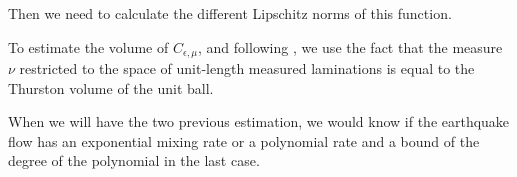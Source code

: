 Then we need to calculate the different Lipschitz norms of this function.

To estimate the volume of $C_{\epsilon,\mu}$, and following \cite{fu2015cusp}, we use the fact that the measure $\nu$ restricted to the space of unit-length measured laminations is equal to the Thurston volume of the unit ball.

When we will have the two previous estimation, we would know if the earthquake flow has an exponential mixing rate or a polynomial rate and a bound of the degree of the polynomial in the last case.
